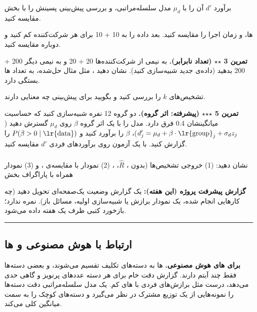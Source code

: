 برآورد \(d'\) آن را با \(\mu_d\) مدل سلسله‌مراتبی، و بررسی پیش‌بینی پسینش
را با بخش  مقایسه کنید.

ها،  و زمان اجرا را مقایسه کنید. بعد داده را به
10 + 10  برای هر شرکت‌کننده کم کنید و دوباره مقایسه کنید.

\textbf{تمرین 3 \ensuremath{\star}\ensuremath{\star} (تعداد  نابرابر).} به نیمی از شرکت‌کننده‌ها
20 + 20  و به نیمی دیگر 200 + 200  بدهید (داده‌ی جدید
شبیه‌سازی کنید). نشان دهید ، مثل مثال حل‌شده، به تعداد
ها بستگی دارد.

تشخیص‌های \(k\) را بررسی کنید و بگویید برای پیش‌بینی
 چه معنایی دارند.

\textbf{تمرین 5 \ensuremath{\star}\ensuremath{\star}\ensuremath{\star} (پیشرفته: اثر گروه).} دو گروه 12 نفره شبیه‌سازی کنید
که حساسیت میانگینشان 0.4 فرق دارد. مدل را با یک اثر گروه \(\beta\) روی
\(\mu_d\) گسترش دهید
(\(d'_j = \mu_d + \beta\cdot\text{\lr{group}}_j + \sigma_d z_j\))، \(\beta\)
را برآورد کنید و \(P(\beta > 0\mid\text{\lr{data}})\) را گزارش کنید. با یک
آزمون  روی برآوردهای فردی \(d'\) مقایسه کنید.

\subsubsection{\texorpdfstring{}{lab check-off}}

نشان دهید: (1) خروجی تشخیص‌ها (بدون ، \(\hat R\)،
، (2) نمودار  با مقایسه‌ی ، و (3) نمودار
 همراه با پاراگراف بخش 

\textbf{گزارش پیشرفت پروژه (این هفته):} یک گزارش وضعیت یک‌صفحه‌ای تحویل
دهید (چه کارهایی انجام شده، یک نمودار برازش یا شبیه‌سازی اولیه، مسائل
باز). نمره ندارد؛ بازخورد کتبی ظرف یک هفته داده می‌شود.

\begin{center}\rule{0.5\linewidth}{0.5pt}\end{center}

\subsection{\texorpdfstring{ارتباط با هوش مصنوعی و
ها}{ارتباط با هوش مصنوعی و LLMها}}

\textbf{ برای های هوش مصنوعی.}
ها به دسته‌های تکلیف تقسیم می‌شوند، و بعضی دسته‌ها فقط چند
آیتم دارند. گزارش دقت خام برای هر دسته عددهای پرنویز و گاهی حدی می‌دهد،
درست مثل برازش‌های فردی  با های کم. یک مدل سلسله‌مراتبی
دقت دسته‌ها را نمونه‌هایی از یک توزیع مشترک در نظر می‌گیرد و دسته‌های کوچک
را به سمت میانگین کلی  می‌کند.

